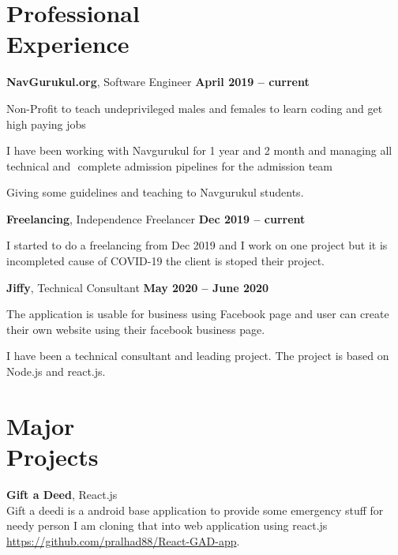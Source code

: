 \documentclass[margin,line]{resume}
\begin{document}
\begin{resume}
    \section{\mysidestyle Professional\\Experience}
    \textbf{NavGurukul.org}, Software Engineer \hfill \textbf{April 2019 -- current}
    \begin{list2}
        \item Non-Profit to teach undeprivileged males and females to learn coding and get high paying jobs
        \item I have been working with Navgurukul for 1 year and 2 month and managing all technical and ​ complete admission pipelines for the admission team
        \item Giving some guidelines and teaching to Navgurukul students.
    \end{list2}\vspace{-1.5mm}

    \textbf{Freelancing}, Independence Freelancer \hfill \textbf{Dec 2019 -- current}
    \begin{list2}
        \item I started to do a freelancing from Dec 2019 and I work on one project but it is incompleted cause of COVID-19 the client is stoped their project.
    \end{list2}\vspace{-1.5mm}

    \textbf{Jiffy}, Technical Consultant \hfill \textbf{May 2020 -- June 2020}
    \begin{list2}
        \item The application is usable for business using Facebook page and user can create their own website using their facebook business page.
        \item I have been a technical consultant and leading project. The project is based on Node.js and react.js.
    \end{list2}\vspace{-1.5mm}

    
    \section{\mysidestyle Major\\Projects}
    \textbf{Gift a Deed}, React.js
    \\ Gift a deedi is a android base application to provide some emergency stuff for needy person I am cloning that into web application using react.js \url{https://github.com/pralhad88/React-GAD-app}.
    

\end{resume}
\end{document}
